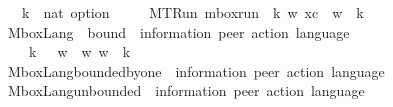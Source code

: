 \begin{isabellebody}
\ \ \ k\ {\isacharcolon}{\kern0pt}{\isacharcolon}{\kern0pt}\ {\isachardoublequoteopen}nat\ option{\isachardoublequoteclose}\ \isanewline
\ \ \ \ MTRun{\isacharcolon}{\kern0pt}\ {\isachardoublequoteopen}mbox{\isacharunderscore}{\kern0pt}run\ {\isasymC}\isactrlsub {\isasymI}\isactrlsub {\isasymmm}\ k\ w\ xc\ {\isasymLongrightarrow}\ w\ {\isasymin}\ {\isasymT}\isactrlbsub k\isactrlesub {\isachardoublequoteclose}\isanewline
\isanewline
%
\isanewline
{}\isamarkupfalse%
\ MboxLang\ {\isacharcolon}{\kern0pt}{\isacharcolon}{\kern0pt}\ {\isachardoublequoteopen}bound\ {\isasymRightarrow}\ {\isacharparenleft}{\kern0pt}{\isacharprime}{\kern0pt}information{\isacharcomma}{\kern0pt}\ {\isacharprime}{\kern0pt}peer{\isacharparenright}{\kern0pt}\ action\ language{\isachardoublequoteclose}\ \ {\isacharparenleft}{\kern0pt}{\isachardoublequoteopen}{\isasymL}\isactrlbsub {\isacharunderscore}{\kern0pt}\isactrlesub {\isachardoublequoteclose}\ {\isacharbrackleft}{\kern0pt}{}{}{}{\isacharbrackright}{\kern0pt}\ {}{}{}{\isacharparenright}{\kern0pt}\isanewline
\ \ \isanewline
\ \ \ \ {\isachardoublequoteopen}{\isasymL}\isactrlbsub k\isactrlesub \ {\isasymequiv}\ {\isacharbraceleft}{\kern0pt}\ w{\isasymdown}\isactrlsub {\isacharbang}{\kern0pt}\ {\isacharbar}{\kern0pt}\ w{\isachardot}{\kern0pt}\ w\ {\isasymin}\ {\isasymT}\isactrlbsub k\isactrlesub \ {\isacharbraceright}{\kern0pt}{\isachardoublequoteclose}\isanewline
\isanewline
{}\isamarkupfalse%
\ MboxLang{\isacharunderscore}{\kern0pt}bounded{\isacharunderscore}{\kern0pt}by{\isacharunderscore}{\kern0pt}one\ {\isacharcolon}{\kern0pt}{\isacharcolon}{\kern0pt}\ {\isachardoublequoteopen}{\isacharparenleft}{\kern0pt}{\isacharprime}{\kern0pt}information{\isacharcomma}{\kern0pt}\ {\isacharprime}{\kern0pt}peer{\isacharparenright}{\kern0pt}\ action\ language{\isachardoublequoteclose}\ \ {\isacharparenleft}{\kern0pt}{\isachardoublequoteopen}{\isasymL}\isactrlsub {\isasymone}{\isachardoublequoteclose}\ {}{}{}{\isacharparenright}{\kern0pt}\ \isanewline
\ \ {\isachardoublequoteopen}{\isasymL}\isactrlsub {\isasymone}\ {\isasymequiv}\ {\isasymL}\isactrlbsub {\isasymB}\ {}\isactrlesub {\isachardoublequoteclose}\isanewline
\isanewline
{}\isamarkupfalse%
\ MboxLang{\isacharunderscore}{\kern0pt}unbounded\ {\isacharcolon}{\kern0pt}{\isacharcolon}{\kern0pt}\ {\isachardoublequoteopen}{\isacharparenleft}{\kern0pt}{\isacharprime}{\kern0pt}information{\isacharcomma}{\kern0pt}\ {\isacharprime}{\kern0pt}peer{\isacharparenright}{\kern0pt}\ action\ language{\isachardoublequoteclose}\ \ {\isacharparenleft}{\kern0pt}{\isachardoublequoteopen}{\isasymL}\isactrlsub {\isasyminfinity}{\isachardoublequoteclose}\ {}{}{}{\isacharparenright}{\kern0pt}\ \isanewline

\end{isabellebody}
